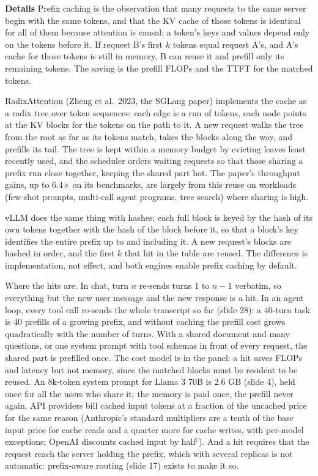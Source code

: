\documentclass[11pt,letterpaper]{article}
\newcommand{\para}[1]{\medskip\noindent\textbf{#1}\quad}
\begin{document}
\para{Details} Prefix caching is the observation that many requests to the same server begin with the same tokens, and that the KV cache of those tokens is identical for all of them because attention is causal: a token's keys and values depend only on the tokens before it. If request B's first $k$ tokens equal request A's, and A's cache for those tokens is still in memory, B can reuse it and prefill only its remaining tokens. The saving is the prefill FLOPs and the TTFT for the matched tokens.

RadixAttention (Zheng et al.\ 2023, the SGLang paper) implements the cache as a radix tree over token sequences: each edge is a run of tokens, each node points at the KV blocks for the tokens on the path to it. A new request walks the tree from the root as far as its tokens match, takes the blocks along the way, and prefills its tail. The tree is kept within a memory budget by evicting leaves least recently used, and the scheduler orders waiting requests so that those sharing a prefix run close together, keeping the shared part hot. The paper's throughput gains, up to 6.4$\times$ on its benchmarks, are largely from this reuse on workloads (few-shot prompts, multi-call agent programs, tree search) where sharing is high.

vLLM does the same thing with hashes: each full block is keyed by the hash of its own tokens together with the hash of the block before it, so that a block's key identifies the entire prefix up to and including it. A new request's blocks are hashed in order, and the first $k$ that hit in the table are reused. The difference is implementation, not effect, and both engines enable prefix caching by default.

Where the hits are. In chat, turn $n$ re-sends turns $1$ to $n-1$ verbatim, so everything but the new user message and the new response is a hit. In an agent loop, every tool call re-sends the whole transcript so far (slide 28): a 40-turn task is 40 prefills of a growing prefix, and without caching the prefill cost grows quadratically with the number of turns. With a shared document and many questions, or one system prompt with tool schemas in front of every request, the shared part is prefilled once. The cost model is in the panel: a hit saves FLOPs and latency but not memory, since the matched blocks must be resident to be reused. An 8k-token system prompt for Llama 3 70B is 2.6 GB (slide 4), held once for all the users who share it; the memory is paid once, the prefill never again. API providers bill cached input tokens at a fraction of the uncached price for the same reason (Anthropic's standard multipliers are a tenth of the base input price for cache reads and a quarter more for cache writes, with per-model exceptions; OpenAI discounts cached input by half$^\dagger$). And a hit requires that the request reach the server holding the prefix, which with several replicas is not automatic: prefix-aware routing (slide 17) exists to make it so.
\end{document}
